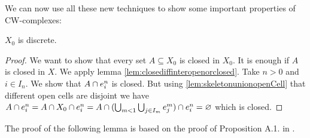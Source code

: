 We can now use all these new techniques to show some important properties of CW-complexes: 

\begin{lem}
    $X_0$ is discrete.
\end{lem}
\begin{proof}
    We want to show that every set $A \subseteq X_0$ is closed in $X_0$.
    It is enough if $A$ is closed in $X$. 
    We apply lemma \ref{lem:closediffinteropenorclosed}. 
    Take $n > 0$ and $i \in I_n$. 
    We show that $A \cap \openCell{n}{i}$ is closed. 
    But using \ref{lem:skeletonunionopenCell} that different open cells are disjoint we have $A \cap \openCell{n}{i} = A \cap X_0 \cap \openCell{n}{i} = A \cap (\bigcup_{m < 1}\bigcup_{j \in I_m}\openCell{m}{j}) \cap \openCell{n}{i} = \varnothing$ which is closed.
\end{proof}

The proof of the following lemma is based on the proof of Proposition A.1. in \cite{Hatcher2001}.

